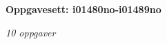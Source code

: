 \centerline{\bf Oppgavesett: i01480no-i01489no}
\vskip 10pt
\centerline{\it 10 oppgaver}\vskip 10pt
\vskip 10pt
